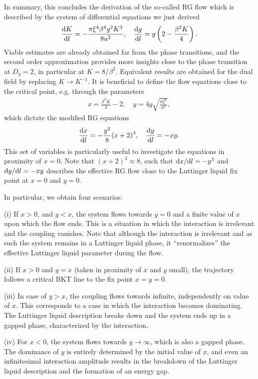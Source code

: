 In summary, this concludes the derivation of the so-called RG flow which is described by the system of differential equations we just derived
\begin{align}
    \frac{\mathrm d K}{\mathrm d l} = -\frac{\pi \xi^4 \beta^4 g^2 K^3}{8u^2},
    \quad
    \frac{\mathrm d g}{\mathrm d l} = g\left( 2-\frac{\beta^2K}4 \right).
\end{align}
Viable estimates are already obtained far from the phase transitions, and the second order approximation provides more insights close to the phase transition at $D_g=2$, in particular at $K=8/\beta^2$.
Equivalent results are obtained for the dual field by replacing $K\rightarrow K^{-1}$.
It is beneficial to define the flow equations close to the critical point, e.g. through the parameters
\begin{align}
    x = \frac{\beta^2 K}4 - 2,
    \quad
    y = 4g\sqrt{\frac{\pi\xi^4}{u^2}},
\end{align}
which dictate the modified RG equations
\begin{align}
    \frac{\mathrm d x}{\mathrm d l} = -\frac{y^2}8(x+2)^3,
    \quad
    \frac{\mathrm d y}{\mathrm d l} = - xy.
\end{align}
This set of variables is particularly useful to investigate the equations in proximity of $x=0$.
Note that $(x+2)^3\approx8$, such that $\mathrm d x/\mathrm d l = -y^3$ and $\mathrm d y/\mathrm d l=-xy$ describes the effective RG flow close to the Luttinger liquid fix point at $x=0$ and $y=0$.

In particular, we obtain four scenarios:

(i) If $x>0$, and $y<x$, the system flows towards $y=0$ and a finite value of $x$ upon which the flow ends.
This is a situation in which the interaction is irrelevant and the coupling vanishes.
Note that although the interaction is irrelevant and as such the system remains in a Luttinger liquid phase, it ``renormalizes'' the effective Luttinger liquid parameter during the flow.

(ii) If $x>0$ and $y=x$ (taken in proximity of $x$ and $y$ small), the trajectory follows a critical BKT line to the fix point $x=y=0$.

(iii) In case of $y>x$, the coupling flows towards infinite, independently on value of $x$.
This corresponds to a case in which the interaction becomes dominating.
The Luttinger liquid description breaks down and the system ends up in a gapped phase, characterized by the interaction.

(iv) For $x<0$, the system flows towards $y\rightarrow\infty$, which is also a gapped phase.
The dominance of $y$ is entirely determined by the initial value of $x$, and even an infinitesimal interaction amplitude results in the breakdown of the Luttinger liquid description and the formation of an energy gap.

